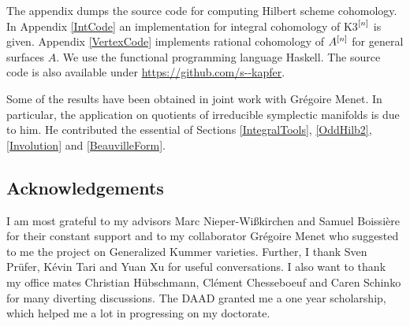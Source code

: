 The appendix dumps the source code for computing Hilbert scheme cohomology. In Appendix \ref{IntCode} an implementation for integral cohomology of K3$^{[n]}$ is given. 
Appendix \ref{VertexCode} implements rational cohomology of $A^{[n]}$ for general surfaces $A$. 
We use the functional programming language Haskell. 
The source code is also available under \url{https://github.com/s--kapfer}.
\vspace{5pt}

Some of the results have been obtained in joint work with Gr\'egoire Menet. In particular, the application on quotients of irreducible symplectic manifolds is due to him.
He contributed the essential of Sections \ref{IntegralTools}, \ref{OddHilb2}, \ref{Involution} and \ref{BeauvilleForm}.

\subsection{Acknowledgements}
I am most grateful to my advisors Marc Nieper-Wi\ss kirchen and Samuel Boissi\`ere for their constant support
and to my collaborator Gr\'egoire Menet who suggested to me the project on Generalized Kummer varieties.
Further, I thank Sven Pr\"ufer, K\'evin Tari and Yuan Xu for useful conversations.
I also want to thank my office mates Christian H\"ubschmann, Cl\'ement Chesseboeuf and Caren Schinko for many diverting discussions.
The DAAD granted me a one year scholarship, which helped me a lot in progressing on my doctorate. 

